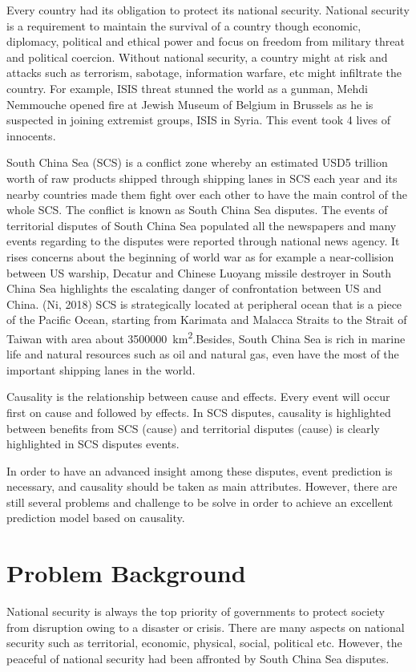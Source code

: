 \documentclass[twoside]{utmthesis}
\begin{document}
Every country had its obligation to protect its national security. National security is a requirement to maintain the survival of a country though economic, diplomacy, political and ethical power and focus on freedom from military threat and political coercion. Without national security, a country might at risk and attacks such as terrorism, sabotage, information warfare, etc might infiltrate the country. For example, ISIS threat stunned the world as a gunman, Mehdi Nemmouche opened fire at Jewish Museum of Belgium in Brussels as he is suspected in joining extremist groups, ISIS in Syria. This event took 4 lives of innocents.\citep{rafcasert}

South China Sea (SCS) is a conflict zone whereby an estimated USD5 trillion worth of raw products shipped through shipping lanes in SCS each year and its nearby countries made them fight over each other to have the main control of the whole SCS. \citep{theNationalInterest} The conflict is known as South China Sea disputes. The events of territorial disputes of South China Sea populated all the newspapers and many events regarding to the disputes were reported through national news agency. It rises concerns about the beginning of world war as for example a near-collision between US warship, Decatur and Chinese Luoyang missile destroyer in South China Sea highlights the escalating danger of confrontation between US and China. (Ni, 2018) SCS is strategically located at peripheral ocean that is a piece of the Pacific Ocean, starting from Karimata and Malacca Straits to the Strait of Taiwan with area about \SI{3500000}{\km\squared}.Besides, South China Sea is rich in marine life and natural resources such as oil and natural gas, even have the most of the important shipping lanes in the world. \citep{dennise.hayes1980}

Causality is the relationship between cause and effects. Every event will occur first on cause and followed by effects. In SCS disputes, causality is highlighted between benefits from SCS (cause) and territorial disputes (cause) is clearly highlighted in SCS disputes events.
	
In order to have an advanced insight among these disputes, event prediction is necessary, and causality should be taken as main attributes. However, there are still several problems and challenge to be solve in order to achieve an excellent prediction model based on causality.  


\section{Problem Background}
National security is always the top priority of governments to protect society from disruption owing to a disaster or crisis. There are many aspects on national security such as territorial, economic, physical, social, political etc. However, the peaceful of national security had been affronted by South China Sea disputes. 
\end{document}
